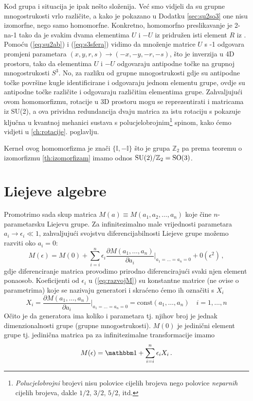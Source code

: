 Kod grupa  i  situacija je ipak nešto složenija. Već smo vidjeli
da su grupne mnogostrukosti vrlo različite, a kako je
pokazano u Dodatku \ref{sec:su2so3} one
nisu izomorfne, nego samo homomorfne.
Konkretno, homomorfno preslikavanje je 2-na-1 tako da je svakim dvama elementima 
$U$ i $-U$ iz  pridružen isti element $R$ iz .
Pomoću (\ref{eq:su2ab}) i (\ref{eq:s3sfera}) vidimo da množenje matrice $U$
s -1 odgovara promjeni parametara $(x, y, r, s) \to (-x, -y, -r, -s)$,
što je inverzija u 4D prostoru, tako da elementima $U$ i $-U$ odgovaraju
antipodne točke na grupnoj mnogostrukosti $S^3$. No, za razliku od
grupne mnogostrukosti  gdje su antipodne točke površine kugle
identificirane i odgovaraju jednom elementu grupe, ovdje su antipodne
točke različite i odgovaraju različitim elementima grupe.
Zahvaljujući ovom homomorfizmu, rotacije u 3D prostoru mogu se reprezentirati
i matricama iz SU(2), a ova prividna redundancija dvaju matrica za
istu rotaciju s pokazuje ključna u kvantnoj mehanici sustava s
polucjelobrojnim\footnote{\emph{Polucjelobrojni} brojevi nisu polovice
    cijelih brojeva nego polovice \emph{neparnih} cijelih brojeva,
dakle $1/2$, $3/2$, $5/2$, itd.} spinom,
kako ćemo vidjeti u \ref{ch:rotacije}. poglavlju.

Kernel ovog homomorfizma je znači $\{\mathbb{I}, -\mathbb{I}\}$ što je
grupa $\mathbb{Z}_2$ pa prema
teoremu o izomorfizmu \ref{th:izomorfizam} imamo
odnos $\mathrm{SU}(2)/\mathbb{Z}_2 = \mathrm{SO}(3)$.





\section{Liejeve algebre}
\label{sec:liejevealgebre}

Promotrimo sada skup matrica $M(a)\equiv M(a_1, a_2, \ldots, a_n)$ koje
čine $n$-pa\-ra\-me\-tar\-sku Liejevu grupe.
Za infinitezimalno male vrijednosti parametara $a_i \to \epsilon_i \ll 1$, zahvaljujući
svojstvu diferencijabilnosti Liejeve grupe možemo razviti oko $a_i = 0$:
\begin{equation}
   M(\epsilon)=M(0)+ \sum_{i=i}^{n}\epsilon_i \frac{\partial M(a_1, \ldots, a_n)}
 {\partial a_i}\Bigg|_{a_1=\ldots =a_n=0} + 0(\epsilon^2) \,,
 \label{eq:razvojM}
\end{equation}
gdje diferenciranje matrica provodimo prirodno diferencirajući svaki njen
element ponaosob. Koeficijenti od $\epsilon_i$ u (\ref{eq:razvojM}) su
konstantne matrice (ne ovise o parametrima) koje se nazivaju generatori
i skraćeno ćemo ih označiti s $X_i$
\begin{equation}
X_i =  \frac{\partial M(a_1, \ldots, a_n)}
 {\partial a_i}\Bigg|_{a_1=\ldots =a_n=0} = \textrm{const}(a_1, \ldots, a_n)
   \quad i=1, \ldots, n 
   \label{eq:defXi}
\end{equation}
Očito je da generatora ima koliko i parametara tj. njihov broj je jednak
dimenzionalnosti grupe (grupne mnogostrukosti).  $M(0)$ je jedinični
element grupe tj. jedinična matrica pa za infinitezimalne transformacije imamo
\begin{equation}
  M(\epsilon)=\Eins + \sum_{i=i}^{n}\epsilon_i X_i \,. 
\end{equation}

